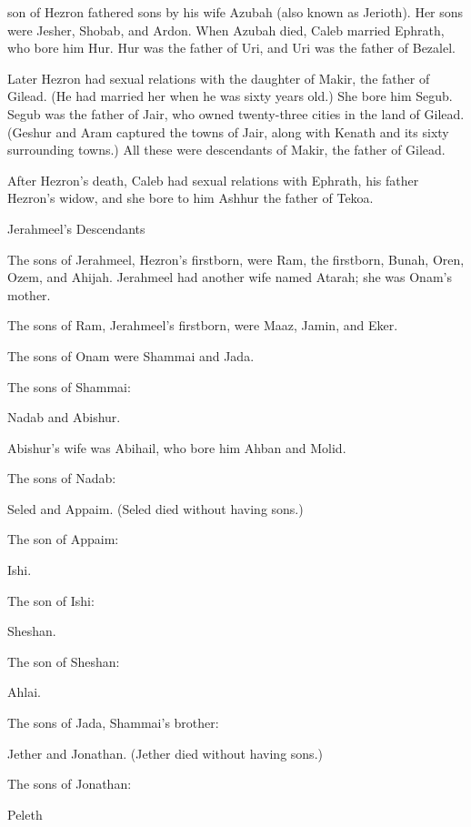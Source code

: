 {son
of Hezron
fathered sons
by his wife
Azubah
(also known as Jerioth). Her sons
were Jesher,
Shobab,
and Ardon.
When Azubah
died,
Caleb
married
Ephrath,
who bore
him Hur.
Hur
was the father
of Uri,
and Uri
was the father
of Bezalel.
\par }{\PP {}Later
Hezron
had sexual relations with
the daughter
of Makir,
the father
of Gilead.
(He
had married
her
when he
was sixty
years
old.) She bore
him Segub.
Segub
was the father
of Jair,
who owned twenty-three
cities
in the land
of Gilead.
(Geshur
and Aram
captured
the towns
of Jair,
along with
Kenath
and its sixty
surrounding
towns.) All
these
were descendants
of Makir,
the father
of Gilead.
\par }{\PP {}After
Hezron’s
death,
Caleb
had sexual relations with Ephrath,
his father Hezron’s
widow,
and she bore
to him Ashhur
the father
of Tekoa.
\par }{\SH Jerahmeel’s Descendants
\par }{\PP {}The sons
of Jerahmeel,
Hezron’s
firstborn,
were Ram,
the firstborn,
Bunah,
Oren,
Ozem,
and Ahijah.
Jerahmeel
had another
wife
named
Atarah;
she
was Onam’s
mother.
\par }{\PP {}The sons
of Ram,
Jerahmeel’s
firstborn,
were Maaz,
Jamin,
and Eker.
\par }{\PP {}The sons
of Onam
were Shammai
and Jada.
\par }{\PP The sons
of Shammai:
\par }{\PP Nadab
and Abishur.
\par }{\PP {}Abishur’s
wife
was Abihail,
who bore
him Ahban
and Molid.
\par }{\PP {}The sons
of Nadab:
\par }{\PP Seled
and Appaim.
(Seled
died
without having sons.)
\par }{\PP {}The son
of Appaim:
\par }{\PP Ishi.
\par }{\PP The son
of Ishi:
\par }{\PP Sheshan.
\par }{\PP The son
of Sheshan:
\par }{\PP Ahlai.
\par }{\PP {}The sons
of Jada,
Shammai’s
brother:
\par }{\PP Jether
and Jonathan.
(Jether
died
without
having sons.)
\par }{\PP {}The sons
of Jonathan:
\par }{\PP Peleth
}
